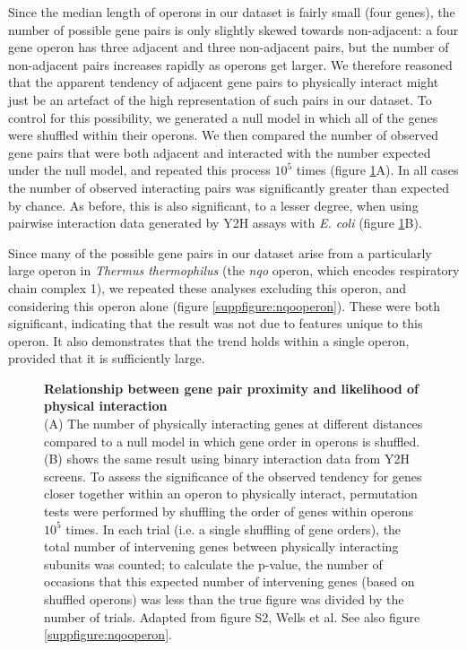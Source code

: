 \documentclass[a4paper,11pt,twoside,openright]{scrbook}
\begin{document}
Since the median length of operons in our dataset is fairly small (four genes), the number of possible gene pairs is only slightly skewed towards non-adjacent: a four gene operon has three adjacent and three non-adjacent pairs, but the number of non-adjacent pairs increases rapidly as operons get larger. We therefore reasoned that the apparent tendency of adjacent gene pairs to physically interact might just be an artefact of the high representation of such pairs in our dataset. To control for this possibility, we generated a null model in which all of the genes were shuffled within their operons. We then compared the number of observed gene pairs that were both adjacent and interacted with the number expected under the null model, and repeated this process \(10^{5}\) times (figure \ref{figure:interveningcontrol}A). In all cases the number of observed interacting pairs was significantly greater than expected by chance. As before, this is also significant, to a lesser degree, when using pairwise interaction data generated by Y2H assays with \textit{E. coli} (figure \ref{figure:interveningcontrol}B).

Since many of the possible gene pairs in our dataset arise from a particularly large operon in \textit{Thermus thermophilus} (the \textit{nqo} operon, which encodes respiratory chain complex 1), we repeated these analyses excluding this operon, and considering this operon alone (figure \ref{suppfigure:nqooperon}). These were both significant, indicating that the result was not due to features unique to this operon. It also demonstrates that the trend holds within a single operon, provided that it is sufficiently large.

\begin{figure}[h]
    \caption[Relationship between gene pair proximity and likelihood of physical interaction]{\sffamily \textbf{Relationship between gene pair proximity and likelihood of physical interaction} \\ \small (A) The number of physically interacting genes at different distances compared to a null model in which gene order in operons is shuffled. (B) shows the same result using binary interaction data from Y2H screens\cite{Rajagopala2014}. To assess the significance of the observed tendency for genes closer together within an operon to physically interact, permutation tests were performed by shuffling the order of genes within operons $10^{5}$ times. In each trial (i.e. a single shuffling of gene orders), the total number of intervening genes between physically interacting subunits was counted; to calculate the p-value, the number of occasions that this expected number of intervening genes (based on shuffled operons) was less than the true figure was divided by the number of trials. Adapted from figure S2, Wells et al. \cite{Wells2016} See also figure \ref{suppfigure:nqooperon}.}
    \label{figure:interveningcontrol}
\end{figure}
\end{document}
